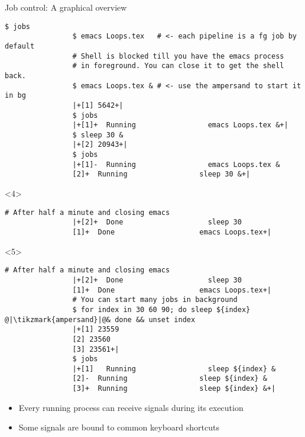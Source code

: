 \begin{frame}[fragile]{Job control: A graphical overview}
\begin{overlayarea}{\textwidth}{0.7\textheight}
\begin{onlyenv}
\begin{lstlisting}[style=MyBash, xrightmargin=2mm, xleftmargin=2mm]
                $ jobs
                $ emacs Loops.tex   # <- each pipeline is a fg job by default
                # Shell is blocked till you have the emacs process
                # in foreground. You can close it to get the shell back.
                $ emacs Loops.tex & # <- use the ampersand to start it in bg
                |+[1] 5642+|
                $ jobs
                |+[1]+  Running                 emacs Loops.tex &+|
                $ sleep 30 &
                |+[2] 20943+|
                $ jobs
                |+[1]-  Running                 emacs Loops.tex &
                [2]+  Running                 sleep 30 &+|
            \end{lstlisting}
        \end{onlyenv}
        \begin{onlyenv}<4>
            \begin{lstlisting}[style=MyBash, xrightmargin=2mm, xleftmargin=2mm, firstnumber=14]
                # After half a minute and closing emacs
                |+[2]+  Done                    sleep 30
                [1]+  Done                    emacs Loops.tex+|
            \end{lstlisting}
        \end{onlyenv}
        \begin{onlyenv}<5>
            \begin{lstlisting}[style=MyBash, xrightmargin=2mm, xleftmargin=2mm, firstnumber=14]
                # After half a minute and closing emacs
                |+[2]+  Done                    sleep 30
                [1]+  Done                    emacs Loops.tex+|
                # You can start many jobs in background
                $ for index in 30 60 90; do sleep ${index} @|\tikzmark{ampersand}|@& done && unset index
                |+[1] 23559
                [2] 23560
                [3] 23561+|
                $ jobs
                |+[1]   Running                 sleep ${index} &
                [2]-  Running                 sleep ${index} &
                [3]+  Running                 sleep ${index} &+|
            \end{lstlisting}
        \end{onlyenv}
        \begin{itemize}[<only@6>]
            \item Every running process can receive signals during its execution
            \item Some signals are bound to common keyboard shortcuts\\[0.5ex]

\end{itemize}
\end{overlayarea}
\end{frame}
